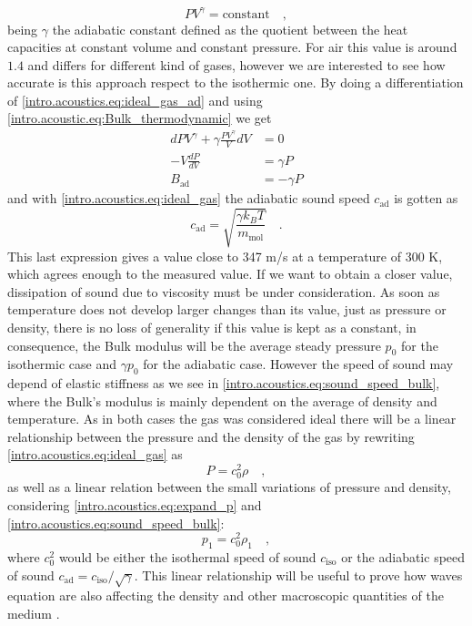 \begin{equation}\label{intro.acoustics.eq:ideal_gas_ad}
    PV^\gamma = \text{constant}\quad,
\end{equation}
being $\gamma$ the adiabatic constant defined as the quotient between the heat capacities at constant volume and constant pressure. For air this value is around $1.4$ and differs for different kind of gases, however we are interested to see how accurate is this approach respect to the isothermic one. By doing a differentiation of \ref{intro.acoustics.eq:ideal_gas_ad} and using \ref{intro.acoustic.eq:Bulk_thermodynamic} we get
\begin{align}
    dPV^\gamma + \gamma\frac{PV^\gamma}{V}dV &= 0 \nonumber\\
    -V\frac{dP}{dV} &= \gamma P \\
    B_{\text{ad}} &= -\gamma P\label{intro.acoustics.eq:ad_bulk}
\end{align}
and with \ref{intro.acoustics.eq:ideal_gas} the adiabatic sound speed $c_{\text{ad}}$ is gotten as
\begin{equation}\label{intro.acoustics.eq:iso_sound_speed}
    c_{\text{ad}} = \sqrt{\frac{\gamma k_B T}{m_\text{mol}}}\quad.
\end{equation}
This last expression gives a value close to 347 m/s at a temperature of 300 K, which agrees enough to the measured value. If we want to obtain a closer value, dissipation of sound due to viscosity must be under consideration. As soon as temperature does not develop larger changes than its value, just as pressure or density, there is no loss of generality if this value is kept as a constant, in consequence, the Bulk modulus will be the average steady pressure $p_0$ for the isothermic case and $\gamma p_0$ for the adiabatic case. However the speed of sound may depend of elastic stiffness as we see in \ref{intro.acoustics.eq:sound_speed_bulk}, where the Bulk's modulus is mainly dependent on the average of density and temperature. As in both cases the gas was considered ideal there will be a linear relationship between the pressure and the density of the gas by rewriting \ref{intro.acoustics.eq:ideal_gas} as
\begin{equation}\label{intro.acoustics.eq:linear_P_total_rho}
    P = c_0^2\rho\quad,
\end{equation}
as well as a linear relation between the small variations of pressure and density, considering \ref{intro.acoustics.eq:expand_p} and \ref{intro.acoustics.eq:sound_speed_bulk}:
\begin{equation}\label{intro.acoustics.eq:linear_p_rho}
    p_1 = c_0^2\rho_1\quad,
\end{equation}
where $c_0^2$ would be either the isothermal speed of sound $c_{\text{iso}}$ or the adiabatic speed of sound $c_{\text{ad}} = c_{\text{iso}}/\sqrt{\gamma}$. This linear relationship will be useful to prove how waves equation are also affecting the density and other macroscopic quantities of the medium \cite[p.~139-142]{Elmore}.\\ 

